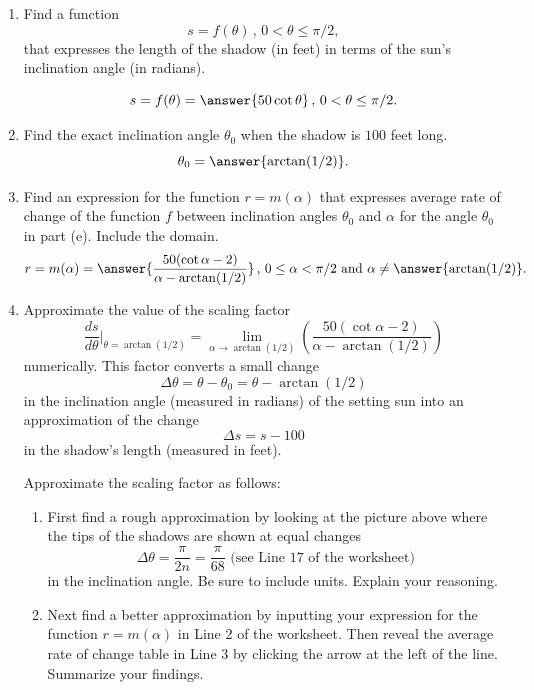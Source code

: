\documentclass{ximera}
\begin{document}
\begin{question}
\begin{enumerate}
\item Find a function
\[
       s = f(\theta) \, , \, 0 <  \theta  \leq \pi/2 ,
\]
that expresses the length of the shadow (in feet) in terms of the sun's inclination angle (in radians).

\[
     s = f(\theta) = \answer{50 \cot \theta} \, , \, 0 < \theta \leq \pi/2.
\]

\item Find the exact inclination angle $\theta_0$ when the shadow is $100$ feet long. 
\[
    \theta_0 = \answer{\arctan (1/2)}.
\]

\item Find an expression for the function $r=m(\alpha)$  that expresses average rate of change of the function $f$ between inclination angles $\theta_0$ and $\alpha$ for the angle $\theta_0$ in part (e). Include the domain.
\[
         r = m(\alpha) = \answer{\frac{50(\cot \alpha - 2)}{\alpha - \arctan(1/2)}} \, , \,  0\leq \alpha <\pi/2 \text{ and } 
\alpha \neq \answer{\arctan(1/2)} .
\]

\item Approximate the value of the scaling factor
\[
    \frac{ds}{d\theta}\Big|_{\theta = \arctan(1/2)} = \lim_{\alpha\to \arctan(1/2)} \left( \frac{50(\cot \alpha - 2)}{\alpha - \arctan(1/2)}\right)
\]
numerically. This factor converts a small change
\[
   \Delta \theta = \theta - \theta_0 = \theta - \arctan(1/2)
\] 
in the inclination angle (measured in radians) of the setting sun into an approximation of the change
\[
     \Delta s = s - 100
\]
in the shadow's length (measured in feet).

Approximate the scaling factor as follows:

\begin{enumerate}
\item First find a rough approximation by looking at the picture above where the tips of the shadows are shown at equal changes 
\[
   \Delta \theta = \frac{\pi}{2n} = \frac{\pi}{68} \text{ (see Line 17 of the worksheet)}
\]
in the inclination angle. Be sure to include units. Explain your reasoning.
\begin{freeResponse}
\end{freeResponse}

\item Next find a better approximation by inputting your expression for the function $r=m(\alpha)$ in Line 2 of the worksheet. Then reveal the average rate of change table in Line 3 by clicking the arrow at the left of the line. Summarize your findings.
\begin{freeResponse}
\end{freeResponse}


\end{enumerate}
\end{enumerate}
\end{question}
\end{document}
